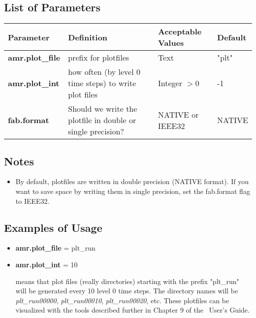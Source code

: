 \subsection{List of Parameters}

\begin{table*}[h]
\begin{scriptsize}
\begin{center}
\begin{tabular}{|l|l|l|l|} \hline
Parameter & Definition & Acceptable Values &Default\\
\hline
{\bf amr.plot\_file} & prefix for plotfiles & Text & "plt" \\
{\bf amr.plot\_int}  & how often (by level 0 time steps) to write plot files & Integer $> 0$ & -1  \\
{\bf fab.format}     & Should we write the plotfile in double or single precision? & NATIVE or IEEE32 & NATIVE \\
\hline
\end{tabular}
\end{center}
\end{scriptsize}
\end{table*}

\subsection{Notes}

\begin{itemize}

\item By default, plotfiles are written in double precision (NATIVE format).  If you want to 
save space by writing them in single precision, set the fab.format flag to IEEE32.

\end{itemize}

\subsection{Examples of Usage}

\begin{itemize}

\item {\bf amr.plot\_file} = plt\_run
\item {\bf amr.plot\_int} = 10

means that plot files (really directories) starting with the prefix "plt\_run" will be
generated every 10 level 0 time steps.  The directory names will be {\it plt\_run00000}, {\it plt\_run00010}, {\it plt\_run00020}, etc.  These plotfiles can be visualized with the
tools described further in Chapter 9 of the \amrex\ User's Guide.

\end{itemize}

